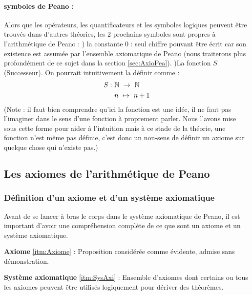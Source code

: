 \paragraph{symboles de Peano :}
Alors que les opérateurs, les quantificateurs et les symboles logiques peuvent être trouvés dans d'autres théories, les 2 prochains symboles sont propres à l'arithmétique de Peano : \newline {}) la constante $0$ : seul chiffre pouvant être écrit car son existence est assumée par l'ensemble axiomatique de Peano (nous traiterons plus profondément de ce sujet dans la section \ref{sec:AxioPea}). \newline {})La fonction $S$ (Successeur). \newline
On pourrait intuitivement la définir comme :
\begin{align*}
    S : \ & \mathbb{N} \ \to \ \mathbb{N} \\
        & n \ \mapsto \ n+1 \\
\end{align*}
(Note : il faut bien comprendre qu'ici la fonction est une idée, il ne faut pas l'imaginer dans le sens d'une fonction à proprement parler. Nous l'avons mise sous cette forme pour aider à l'intuition mais à ce stade de la théorie, une fonction n'est même pas définie, c'est donc un non-sens de définir un axiome sur quelque chose qui n'existe pas.)


\subsection{Les axiomes de l'arithmétique de Peano}
\subsubsection{Définition d'un axiome et d'un système axiomatique}

Avant de se lancer à bras le corps dans le système axiomatique de Peano, il est important d'avoir une compréhension complète de ce que sont un axiome et un système axiomatique. \newline

\begin{definition} \label{def:Axiome}
\textbf{Axiome} \ref{itm:Axiome} : \newline
Proposition considérée comme évidente, admise sans démonstration.
\end{definition}
\begin{definition} \label{def:SysAxi}
\textbf{Système axiomatique} \ref{itm:SysAxi} : \newline
Ensemble d'axiomes dont certains ou tous les axiomes peuvent être utilisés logiquement pour dériver des théorèmes.
\end{definition}

